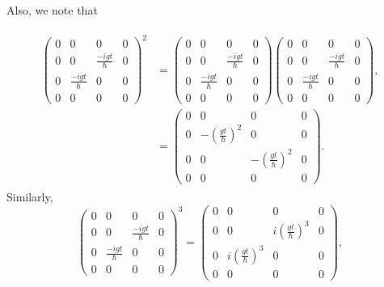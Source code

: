 \documentclass{article}
\begin{document}
        Also, we note that

\begin{align} \label{eq 4.25}
    \begin{split}
        \begin{pmatrix}
            0& 0& 0& 0\\0& 0& \frac{-igt}{\hbar}& 0\\
            0& \frac{-igt}{\hbar}& 0& 0\\ 0& 0& 0& 0
        \end{pmatrix}^2
        &=\begin{pmatrix}
            0& 0& 0& 0\\0& 0& \frac{-igt}{\hbar}& 0\\
            0& \frac{-igt}{\hbar}& 0& 0\\ 0& 0& 0& 0
        \end{pmatrix}\begin{pmatrix}
            0& 0& 0& 0\\0& 0& \frac{-igt}{\hbar}& 0\\
            0& \frac{-igt}{\hbar}& 0& 0\\ 0& 0& 0& 0
        \end{pmatrix},\\
        &=\begin{pmatrix}
            0& 0& 0& 0\\0&  -(\frac{gt}{\hbar})^2& 0& 0\\
            0& 0& -(\frac{gt}{\hbar})^2&  0\\ 0& 0& 0& 0
        \end{pmatrix}.
    \end{split}\tag{4.25}
\end{align}
Similarly,
\begin{equation} \label{eq 4.26}
     \begin{pmatrix}
            0& 0& 0& 0\\0& 0& \frac{-igt}{\hbar}& 0\\
            0& \frac{-igt}{\hbar}& 0& 0\\ 0& 0& 0& 0
        \end{pmatrix}^3
        =\begin{pmatrix}
            0& 0& 0& 0\\0& 0& i(\frac{gt}{\hbar})^3& 0\\
            0& i(\frac{gt}{\hbar})^3& 0& 0\\ 0& 0& 0& 0
        \end{pmatrix}, \tag{4.26}
\end{equation}
\end{document}
